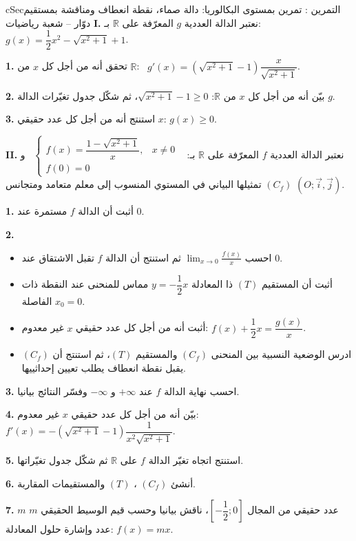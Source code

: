 \documentclass[12pt,a4paper]{article}
\newenvironment{BOX}[2]{\begin{otherlanguage}{english}\begin{arbox}{#1}{#2}}{\end{arbox}\end{otherlanguage}}
\newcounter{exo}
\newenvironment{tamrin}[1]{\stepcounter{exo}\begin{BOX}{cSec}{التمرين \theexo: #1}}{\end{BOX}}
\newcommand{\R}{\mathbb{R}}
\newcommand{\QQ}[1]{\par\smallskip\textbf{#1.} }
\begin{document}
\begin{tamrin}{تمرين بمستوى البكالوريا: دالة صماء، نقطة انعطاف ومناقشة بمستقيم دوّار -- شعبة رياضيات}
\textbf{I.} نعتبر الدالة العددية $g$ المعرّفة على $\R$ بـ: $g(x)=\dfrac12x^{2}-\sqrt{x^{2}+1}+1$.
\QQ{1} تحقق أنه من أجل كل $x$ من $\R$: \ $g'(x)=\left(\sqrt{x^{2}+1}-1\right)\dfrac{x}{\sqrt{x^{2}+1}}$.
\QQ{2} بيّن أنه من أجل كل $x$ من $\R$: $\sqrt{x^{2}+1}-1\geqslant0$، ثم شكّل جدول تغيّرات الدالة $g$.
\QQ{3} استنتج أنه من أجل كل عدد حقيقي $x$: $g(x)\geqslant0$.

\textbf{II.} نعتبر الدالة العددية $f$ المعرّفة على $\R$ بـ: \ $\left\{\begin{array}{ll}f(x)=\dfrac{1-\sqrt{x^{2}+1}}{x}, & x\neq0\\[3mm] f(0)=0\end{array}\right.$ \ و $(C_f)$ تمثيلها البياني في المستوي المنسوب إلى معلم متعامد ومتجانس $(O;\vec i,\vec j)$.
\QQ{1} أثبت أن الدالة $f$ مستمرة عند $0$.
\QQ{2}
\begin{itemize}[label=\textcircled{\scriptsize S}]
\item احسب $\displaystyle\lim_{x\to0}\frac{f(x)}{x}$ ثم استنتج أن الدالة $f$ تقبل الاشتقاق عند $0$.
\item أثبت أن المستقيم $(T)$ ذا المعادلة $y=-\dfrac12x$ مماس للمنحنى عند النقطة ذات الفاصلة $x_0=0$.
\item أثبت أنه من أجل كل عدد حقيقي $x$ غير معدوم: $f(x)+\dfrac12x=\dfrac{g(x)}{x}$.
\item ادرس الوضعية النسبية بين المنحنى $(C_f)$ والمستقيم $(T)$، ثم استنتج أن $(C_f)$ يقبل نقطة انعطاف يطلب تعيين إحداثييها.
\end{itemize}
\QQ{3} احسب نهاية الدالة $f$ عند $+\infty$ و $-\infty$ وفسّر النتائج بيانيا.
\QQ{4} بيّن أنه من أجل كل عدد حقيقي $x$ غير معدوم: \ $f'(x)=-\left(\sqrt{x^{2}+1}-1\right)\dfrac{1}{x^{2}\sqrt{x^{2}+1}}$.
\QQ{5} استنتج اتجاه تغيّر الدالة $f$ على $\R$ ثم شكّل جدول تغيّراتها.
\QQ{6} أنشئ $(C_f)$ ، $(T)$ والمستقيمات المقاربة.
\QQ{7} $m$ عدد حقيقي من المجال $\left[-\dfrac12;0\right]$، ناقش بيانيا وحسب قيم الوسيط الحقيقي $m$ عدد وإشارة حلول المعادلة: $f(x)=mx$.
\end{tamrin}
\end{document}
